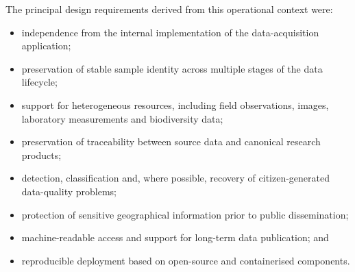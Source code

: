 The principal design requirements derived from this operational context were:

\begin{itemize}
    \item independence from the internal implementation of the data-acquisition application;
    \item preservation of stable sample identity across multiple stages of the data lifecycle;
    \item support for heterogeneous resources, including field observations, images, laboratory measurements and biodiversity data;
    \item preservation of traceability between source data and canonical research products;
    \item detection, classification and, where possible, recovery of citizen-generated data-quality problems;
    \item protection of sensitive geographical information prior to public dissemination;
    \item machine-readable access and support for long-term data publication; and
    \item reproducible deployment based on open-source and containerised components.
\end{itemize}
